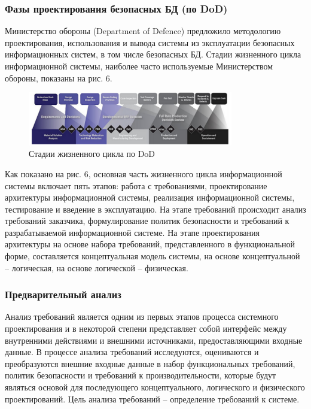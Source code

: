 \subsubsection{Фазы проектирования безопасных БД (по DoD)}

Министерство обороны (Department of Defence) предложило методологию проектирования, использования и вывода
системы из эксплуатации безопасных информационных систем, в том числе безопасных БД. Стадии жизненного
цикла информационной системы, наиболее часто используемые Министерством обороны, показаны на рис. 6.

\begin{figure}[H]
    \centering
    \includegraphics[width=0.8\textwidth]{assets/security/pic1.png}
    \caption{Стадии жизненного цикла по DoD}
    \label{fig:mesh03}
\end{figure}

Как показано на рис. 6, основная часть жизненного цикла информационной системы включает пять этапов: работа
с требованиями, проектирование архитектуры информационной системы, реализация информационной системы,
тестирование и введение в эксплуатацию. На этапе требований происходит анализ требований заказчика,
формулирование политик безопасности и требований к разрабатываемой информационной системе. На этапе проектирования
архитектуры на основе набора требований, представленного в функциональной форме, составляется концептуальная
модель системы, на основе концептуальной – логическая, на основе логической – физическая.

\subsubsection{Предварительный анализ}

Анализ требований является одним из первых этапов процесса системного проектирования и в некоторой степени
представляет собой интерфейс между внутренними действиями и внешними источниками, предоставляющими входные
данные. В процессе анализа требований исследуются, оцениваются и преобразуются внешние входные данные в
набор функциональных требований, политик безопасности и требований к производительности, которые будут являться
основой для последующего концептуального, логического и физического проектирований. Цель анализа требований –
определение требований к системе.

